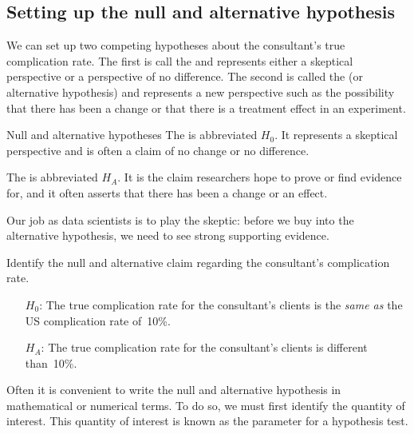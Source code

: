 \subsection{Setting up the null and alternative hypothesis}

We can set up two competing hypotheses about the consultant's true complication rate. The first is call the  and represents either a skeptical perspective or a perspective of no difference. The second is called the  (or alternative hypothesis) and represents a new perspective such as the possibility that there has been a change or that there is a treatment effect in an experiment.

\begin{onebox}{Null and alternative hypotheses}
The  is abbreviated $H_0$. It represents a skeptical perspective and is often a claim of no change or no difference. \vspace{3mm}

The  is abbreviated $H_A$. It is the claim researchers hope to prove or find evidence for, and it often asserts that there has been a change or an effect. \vspace{3mm}

Our job as data scientists is to play the skeptic: before we buy into the alternative hypothesis, we need to see strong supporting evidence.
\end{onebox}

\begin{examplewrap}\begin{nexample}{Identify the null and alternative claim regarding the consultant's complication rate.}
\begin{itemize}
\item[$H_0$:] The true complication rate for the consultant's clients is the \emph{same as} the US complication rate of~10\%.
\item[$H_A$:] The true complication rate for the consultant's clients is different than~10\%.
\end{itemize}
\end{nexample}\end{examplewrap}

Often it is convenient to write the null and alternative hypothesis in mathematical or numerical terms. To do so, we must first identify the quantity of interest. This quantity of interest is known as the parameter for a hypothesis test.


